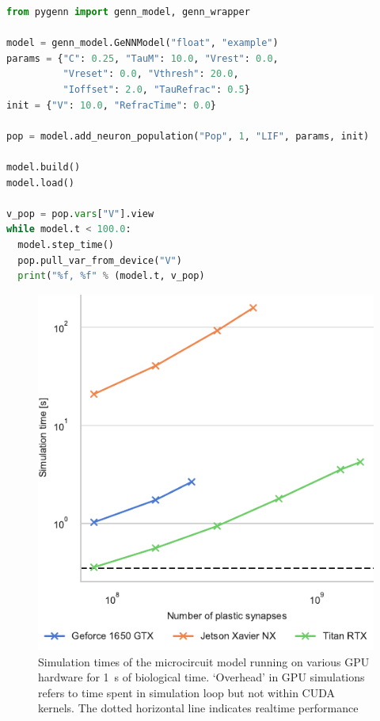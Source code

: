 \documentclass[utf8]{frontiersSCNS} %
\begin{document}
\begin{lstlisting}[language=Python]
from pygenn import genn_model, genn_wrapper

model = genn_model.GeNNModel("float", "example")
params = {"C": 0.25, "TauM": 10.0, "Vrest": 0.0,
          "Vreset": 0.0, "Vthresh": 20.0,
          "Ioffset": 2.0, "TauRefrac": 0.5}
init = {"V": 10.0, "RefracTime": 0.0}

pop = model.add_neuron_population("Pop", 1, "LIF", params, init)

model.build()
model.load()

v_pop = pop.vars["V"].view
while model.t < 100.0:
  model.step_time()
  pop.pull_var_from_device("V")
  print("%f, %f" % (model.t, v_pop)
\end{lstlisting}
%
\begin{figure}[h!]
    \begin{center}
        \includegraphics{figures/hpc_benchmark.pdf}
    \end{center}
    \caption{Simulation times of the microcircuit model running on various GPU hardware for \SI{1}{\second} of biological time.
    `Overhead' in GPU simulations refers to time spent in simulation loop but not within CUDA kernels.
    The dotted horizontal line indicates realtime performance}
    \label{fig:hpc_benchmark}
\end{figure}
%
\end{document}
